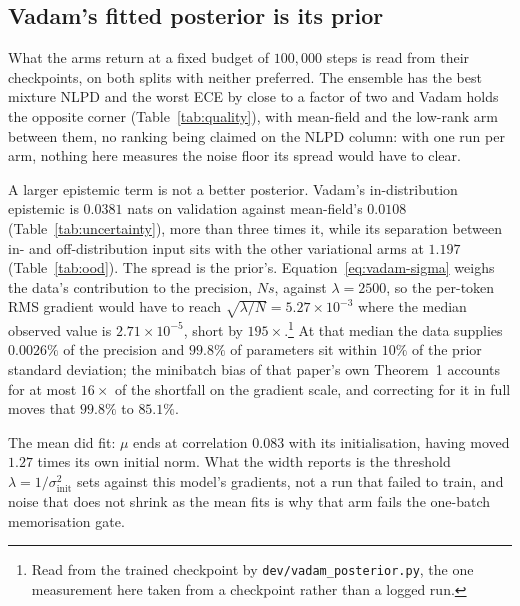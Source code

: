 \subsection{Vadam's fitted posterior is its prior}
\label{sec:find:vadam}

What the arms return at a fixed budget of $100{,}000$ steps is read from their
checkpoints, on both splits with neither preferred. The ensemble has the best mixture
NLPD and the worst ECE by close to a factor of two and Vadam holds the opposite corner
(Table~\ref{tab:quality}), with mean-field and the low-rank arm between them, no
ranking being claimed on the NLPD column: with one run per arm, nothing here measures
the noise floor its spread would have to clear.

A larger epistemic term is not a better posterior. Vadam's in-distribution epistemic
is $0.0381$ nats on validation against mean-field's $0.0108$
(Table~\ref{tab:uncertainty}), more than three times it, while its separation between
in- and off-distribution input sits with the other variational arms at $1.197$
(Table~\ref{tab:ood}). The spread is the prior's. Equation~\ref{eq:vadam-sigma} weighs
the data's contribution to the precision, $N s$, against $\lambda = 2500$, so the
per-token RMS gradient would have to reach $\sqrt{\lambda / N} = 5.27 \times 10^{-3}$
where the median observed value is $2.71 \times 10^{-5}$, short by
$195\times$.\footnote{Read from the trained checkpoint by
\texttt{dev/vadam\_posterior.py}, the one measurement here taken from a checkpoint
rather than a logged run.} At that median the data supplies $0.0026\%$ of the
precision and $99.8\%$ of parameters sit within $10\%$ of the prior standard
deviation; the minibatch bias of that paper's own Theorem~1 accounts for at most
$16\times$ of the shortfall on the gradient scale, and correcting for it in full moves
that $99.8\%$ to $85.1\%$.

The mean did fit: $\mu$ ends at correlation $0.083$ with its initialisation, having
moved $1.27$ times its own initial norm. What the width reports is the threshold
$\lambda = 1/\sigma_{\text{init}}^{2}$ sets against this model's gradients, not a run
that failed to train, and noise that does not shrink as the mean fits is why that arm
fails the one-batch memorisation gate.

\begin{table}[t]
  \centering
  
  \caption{Predictive quality, in nats, over $16{,}384$ positions. ``Single draw'' is
  one posterior sample, or member $0$ for the ensemble: comparable within an arm, not
  across them.}
  \label{tab:quality}
\end{table}


